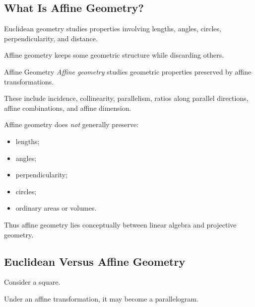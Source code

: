\subsection{What Is Affine Geometry?}
\label{subsec:what-is-affine-geometry}

Euclidean geometry studies properties involving lengths, angles, circles,
perpendicularity, and distance.

Affine geometry keeps some geometric structure while discarding others.

\begin{definitionbox}{Affine Geometry}
\emph{Affine geometry} studies geometric properties preserved by affine
transformations.

These include incidence, collinearity, parallelism, ratios along parallel
directions, affine combinations, and affine dimension.
\end{definitionbox}

Affine geometry does \emph{not} generally preserve:

\begin{itemize}
    \item lengths;
    \item angles;
    \item perpendicularity;
    \item circles;
    \item ordinary areas or volumes.
\end{itemize}

Thus affine geometry lies conceptually between linear algebra and projective
geometry.

\subsection{Euclidean Versus Affine Geometry}
\label{subsec:euclidean-versus-affine}

Consider a square.

Under an affine transformation, it may become a parallelogram.

\begin{centereddiagram}
\end{centereddiagram}

